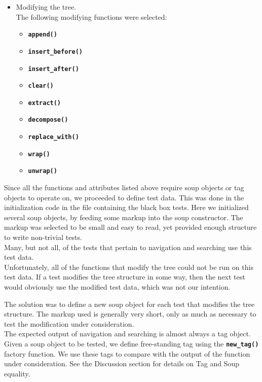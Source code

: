 \documentclass[10pt]{article}
\newcommand{\tbt}[1]{\texttt{\textbf{#1}}}
\begin{document}
\begin{itemize}
  \item Modifying the tree. \\
  The following modifying functions were selected:
    \begin{itemize}
    \setlength\itemsep{-0.05em}
      \item \tbt{append()}
      \item \tbt{insert\_before()}
      \item \tbt{insert\_after()}
      \item \tbt{clear()}
      \item \tbt{extract()}
      \item \tbt{decompose()}
      \item \tbt{replace\_with()}
      \item \tbt{wrap()}
      \item \tbt{unwrap()}
    \end{itemize}
\end{itemize}

Since all the functions and attributes listed above require soup objects or tag objects to operate on, we proceeded to define test data. This was done in the initialization code in the file containing the black box tests. Here we initialized several soup objects, by feeding some markup into the soup constructor. The markup was selected to be small and easy to read, yet provided enough structure to write non-trivial tests.  \\ 

Many, but not all, of the tests that pertain to navigation and searching use this test data. \\

Unfortunately, all of the functions that modify the tree could not be run on this test data. If a test modifies the tree structure in some way, then the next test would obviously use the modified test data, which was not our intention.

The solution was to define a new soup object for each test that modifies the tree structure. The markup used is generally very short, only as much as necessary to test the modification under consideration. \\

The expected output of navigation and searching is almost always a tag object. Given a soup object to be tested, we define free-standing tag using the \tbt{new\_tag()} factory function. We use these tags to compare with the output of the function under consideration. See the Discussion section for details on Tag and Soup equality. \\
\end{document}
